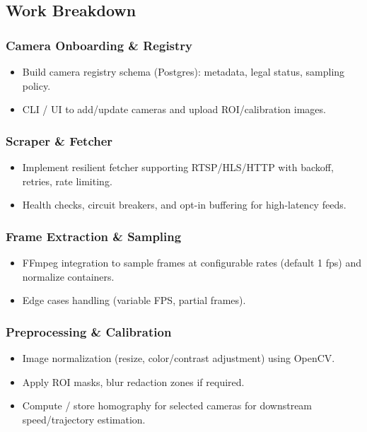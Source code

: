 \subsection{Work Breakdown}
\subsubsection{Camera Onboarding \& Registry}
\begin{itemize}
  \item Build camera registry schema (Postgres): metadata, legal status, sampling policy.
  \item CLI / UI to add/update cameras and upload ROI/calibration images.
\end{itemize}

\subsubsection{Scraper \& Fetcher}
\begin{itemize}
  \item Implement resilient fetcher supporting RTSP/HLS/HTTP with backoff, retries, rate limiting.
  \item Health checks, circuit breakers, and opt-in buffering for high-latency feeds.
\end{itemize}

\subsubsection{Frame Extraction \& Sampling}
\begin{itemize}
  \item FFmpeg integration to sample frames at configurable rates (default 1 fps) and normalize containers.
  \item Edge cases handling (variable FPS, partial frames).
\end{itemize}

\subsubsection{Preprocessing \& Calibration}
\begin{itemize}
  \item Image normalization (resize, color/contrast adjustment) using OpenCV.
  \item Apply ROI masks, blur redaction zones if required.
  \item Compute / store homography for selected cameras for downstream speed/trajectory estimation.
\end{itemize}

